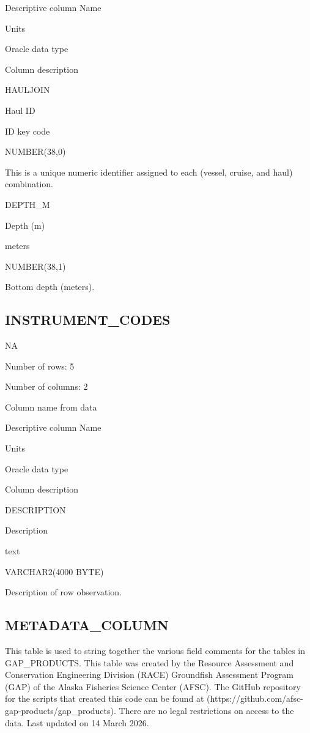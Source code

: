 \documentclass[
  letterpaper,
  oneside,
  open=any]{scrbook}
\begin{document}
Descriptive column Name

Units

Oracle data type

Column description

HAULJOIN

Haul ID

ID key code

NUMBER(38,0)

This is a unique numeric identifier assigned to each (vessel, cruise,
and haul) combination.

DEPTH\_M

Depth (m)

meters

NUMBER(38,1)

Bottom depth (meters).

\subsection{INSTRUMENT\_CODES}\label{instrument_codes}

NA

Number of rows: 5

Number of columns: 2

Column name from data

Descriptive column Name

Units

Oracle data type

Column description

DESCRIPTION

Description

text

VARCHAR2(4000 BYTE)

Description of row observation.

\subsection{METADATA\_COLUMN}\label{metadata_column}

This table is used to string together the various field comments for the
tables in GAP\_PRODUCTS. This table was created by the Resource
Assessment and Conservation Engineering Division (RACE) Groundfish
Assessment Program (GAP) of the Alaska Fisheries Science Center (AFSC).
The GitHub repository for the scripts that created this code can be
found at (https://github.com/afsc-gap-products/gap\_products). There are
no legal restrictions on access to the data. Last updated on 14 March
2026.
\end{document}
